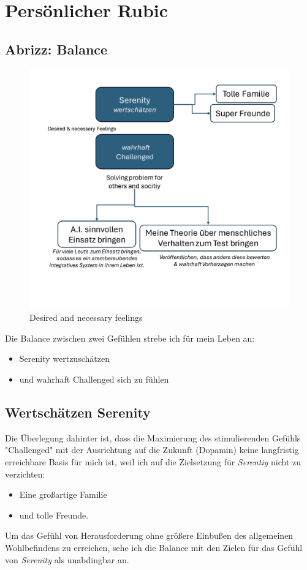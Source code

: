 \section{Persönlicher Rubic}

\subsection{Abrizz: Balance}

\begin{figure}[H]
	\centering
	\includegraphics[scale = 0.2]{attachment/chapter_OWN/Scc009}
	\caption{Desired and necessary  feelings}
\end{figure}

Die Balance zwischen zwei Gefühlen strebe ich für mein Leben an:
\begin{itemize}
    \item Serenity wertzuschätzen 
    \item und wahrhaft Challenged  sich zu fühlen
\end{itemize}

\subsection{Wertschätzen Serenity}

Die Überlegung dahinter ist, dass die Maximierung des stimulierenden Gefühls "Challenged" mit der Ausrichtung auf die Zukunft (Dopamin) keine langfristig erreichbare Basis für mich ist, weil ich auf die Zielsetzung für \textit{Serentiy} nicht zu verzichten:
\begin{itemize}
    \item Eine großartige Familie
    \item und tolle Freunde.
\end{itemize}
Um das Gefühl von Herausforderung ohne größere Einbußen des allgemeinen Wohlbefindens zu erreichen, sehe ich die Balance mit den Zielen für das Gefühl von  \textit{Serenity} als unabdingbar an.\\

